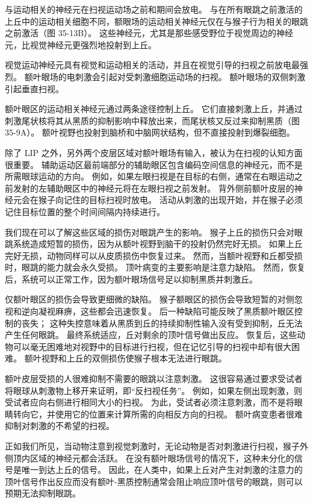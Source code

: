 与运动相关的神经元在扫视运动场之前和期间会放电。 与在所有眼跳之前激活的上丘中的运动相关细胞不同，额眼场的运动相关神经元仅在与猴子行为相关的眼跳之前激活（图 35-13B）。 这些神经元，尤其是那些感受野位于视觉周边的神经元，比视觉神经元更强烈地投射到上丘。

视觉运动神经元具有视觉和运动相关的活动，并且在视觉引导的扫视之前放电最强烈。 额叶眼场的电刺激会引起对受刺激细胞运动场的扫视。 额叶眼场的双侧刺激引起垂直扫视。

额叶眼区的运动相关神经元通过两条途径控制上丘。 它们直接刺激上丘，并通过刺激尾状核将其从黑质的抑制影响中释放出来，而尾状核又反过来抑制黑质（图 35-9A）。 额叶视野也投射到脑桥和中脑网状结构，但不直接投射到爆裂细胞。

除了 LIP 之外，另外两个皮层区域对额叶眼场有输入，被认为在扫视的认知方面很重要。 辅助运动区最前端部分的辅助眼区包含编码空间信息的神经元，而不是所需眼球运动的方向。 例如，如果左眼扫视是在目标的右侧，通常在右眼运动之前发射的左辅助眼区中的神经元将在左眼扫视之前发射。 背外侧前额叶皮层的神经元会在猴子向记住的目标扫视时放电。 活动从刺激的出现开始，并在猴子必须记住目标位置的整个时间间隔内持续进行。

我们现在可以了解这些区域的损伤对眼跳产生的影响。 猴子上丘的损伤只会对眼跳系统造成短暂的损伤，因为从额叶视野到脑干的投射仍然完好无损。 如果上丘完好无损，动物同样可以从皮质损伤中恢复过来。 然而，当额叶视野和丘都受损时，眼跳的能力就会永久受损。 顶叶病变的主要影响是注意力缺陷。 然而，恢复后，系统可以正常工作，因为额叶眼场信号足以抑制黑质并刺激丘。

仅额叶眼区的损伤会导致更细微的缺陷。 猴子额眼区的损伤会导致短暂的对侧忽视和逆向凝视麻痹，这些都会迅速恢复。 后一种缺陷可能反映了黑质额叶眼区控制的丧失； 这种失控意味着从黑质到丘的持续抑制性输入没有受到抑制，丘无法产生任何眼跳。 最终系统适应，丘对剩余的顶叶信号做出反应。 恢复后，这些动物可以毫无困难地对视野中的目标进行扫视，但在记忆引导的扫视中却有很大困难。 额叶视野和上丘的双侧损伤使猴子根本无法进行眼跳。

额叶皮层受损的人很难抑制不需要的眼跳以注意刺激。 这很容易通过要求受试者将眼球从刺激物上移开来证明，即“反扫视任务”。 例如，如果左侧出现刺激，则受试者应向右侧进行相同大小的扫视。 为此，受试者必须注意刺激，而不是将眼睛转向它，并使用它的位置来计算所需的向相反方向的扫视。 额叶病变患者很难抑制对刺激的不希望的扫视。

正如我们所见，当动物注意到视觉刺激时，无论动物是否对刺激进行扫视，猴子外侧顶内区域的神经元都会活跃。 在没有额叶眼场信号的情况下，这种未分化的信号是唯一到达上丘的信号。 因此，在人类中，如果上丘对产生对刺激的注意力的顶叶信号作出反应而没有额叶-黑质控制通常会阻止响应顶叶信号的眼跳，则可以预期无法抑制眼跳。

